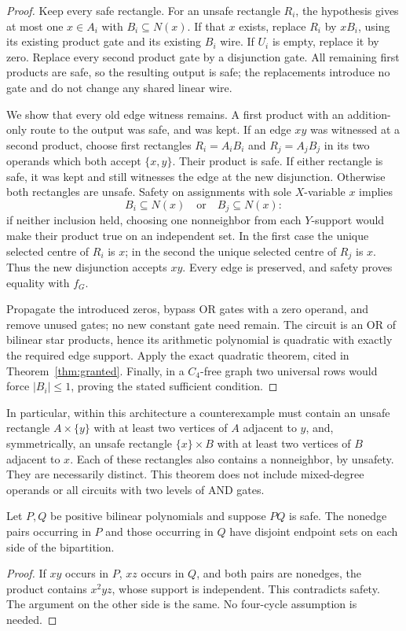 \begin{proof}
Keep every safe rectangle.  For an unsafe rectangle $R_i$, the
hypothesis gives at most one $x\in A_i$ with $B_i\subseteq N(x)$.
If that $x$ exists, replace $R_i$ by $xB_i$, using its existing
product gate and its existing $B_i$ wire.  If $U_i$ is empty, replace
it by zero.  Replace every second product gate by a disjunction gate.
All remaining first products are safe, so the resulting output is
safe; the replacements introduce no gate and do not change any shared
linear wire.

We show that every old edge witness remains.  A first product with
an addition-only route to the output was safe, and was kept.  If an
edge $xy$ was witnessed at a second product, choose first rectangles
$R_i=A_iB_i$ and $R_j=A_jB_j$ in its two operands which both accept
$\{x,y\}$.  Their product is safe.  If either rectangle is safe,
it was kept and still witnesses the edge at the new disjunction.
Otherwise both rectangles are unsafe.
Safety on assignments with sole $X$-variable $x$ implies
\[
 B_i\subseteq N(x)\quad\text{or}\quad B_j\subseteq N(x):
\]
if neither inclusion held, choosing one nonneighbor from each
$Y$-support would make their product true on an independent set.
In the first case the unique selected centre of $R_i$ is $x$;
in the second the unique selected centre of $R_j$ is $x$.
Thus the new disjunction accepts $xy$.  Every edge is preserved,
and safety proves equality with $f_G$.

Propagate the introduced zeros, bypass OR gates with a zero operand,
and remove unused gates; no new constant gate need remain.
The circuit is an OR of bilinear star products, hence
its arithmetic polynomial is quadratic with exactly the required
edge support.  Apply the exact quadratic theorem, cited in Theorem~\ref{thm:granted}.
Finally, in a $C_4$-free graph two universal rows would force
$|B_i|\leq1$, proving the stated sufficient condition.
\end{proof}

In particular, within this architecture a counterexample must contain
an unsafe rectangle $A\times\{y\}$ with at least two vertices of
$A$ adjacent to $y$, and, symmetrically, an unsafe rectangle
$\{x\}\times B$ with at least two vertices of $B$ adjacent to $x$.
Each of these rectangles also contains a nonneighbor, by unsafety.
They are necessarily distinct.
This theorem does not include mixed-degree operands or all circuits
with two levels of AND gates.

\begin{lemma}
Let $P,Q$ be positive bilinear polynomials and suppose $PQ$ is safe.
The nonedge pairs occurring in $P$ and those occurring in $Q$ have
disjoint endpoint sets on each side of the bipartition.
\end{lemma}
\begin{proof}
If $xy$ occurs in $P$, $xz$ occurs in $Q$, and both pairs are
nonedges, the product contains $x^2yz$, whose support is independent.
This contradicts safety.  The argument on the other side is the same.
No four-cycle assumption is needed.
\end{proof}

